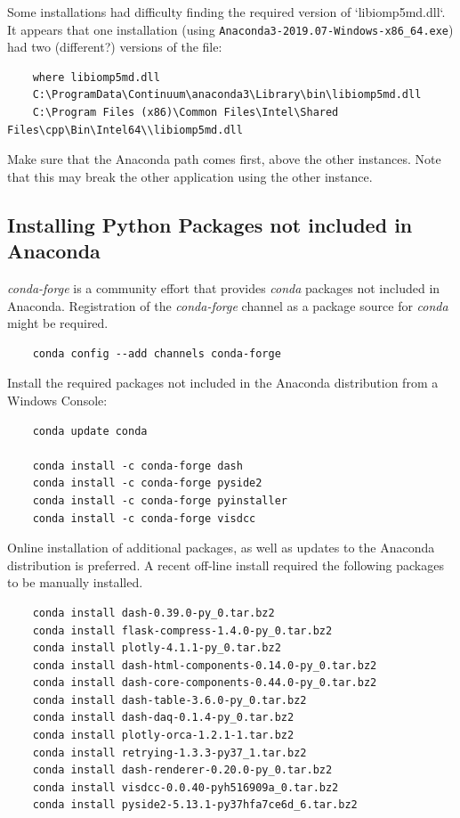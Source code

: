 Some installations had difficulty finding the required version of  `libiomp5md.dll`. It appears that one installation (using  \lstinline{Anaconda3-2019.07-Windows-x86_64.exe}) had two (different?) versions of the file:

\footnotesize
\begin{lstlisting}
    where libiomp5md.dll
    C:\ProgramData\Continuum\anaconda3\Library\bin\libiomp5md.dll
    C:\Program Files (x86)\Common Files\Intel\Shared Files\cpp\Bin\Intel64\\libiomp5md.dll
\end{lstlisting}
\normalsize
Make sure that the Anaconda path comes first, above the other instances.  Note that this may break the other application using the other instance.

\subsection{Installing Python Packages not included in Anaconda}

\textit{conda-forge} is a community effort that provides \textit{conda} packages not included in Anaconda. Registration of the \textit{conda-forge} channel as a package source for \textit{conda} might be required.

\footnotesize
\begin{lstlisting}
    conda config --add channels conda-forge
\end{lstlisting}
\normalsize

Install the required packages not included in the Anaconda distribution from a Windows Console:
\footnotesize
\begin{lstlisting}
    conda update conda

    conda install -c conda-forge dash
    conda install -c conda-forge pyside2
    conda install -c conda-forge pyinstaller
    conda install -c conda-forge visdcc

\end{lstlisting}
\normalsize

Online installation of additional packages, as well as updates to the Anaconda distribution is preferred.
A recent off-line install required the following packages to be manually installed.

\footnotesize
\begin{lstlisting}
    conda install dash-0.39.0-py_0.tar.bz2
    conda install flask-compress-1.4.0-py_0.tar.bz2
    conda install plotly-4.1.1-py_0.tar.bz2
    conda install dash-html-components-0.14.0-py_0.tar.bz2
    conda install dash-core-components-0.44.0-py_0.tar.bz2
    conda install dash-table-3.6.0-py_0.tar.bz2
    conda install dash-daq-0.1.4-py_0.tar.bz2
    conda install plotly-orca-1.2.1-1.tar.bz2
    conda install retrying-1.3.3-py37_1.tar.bz2
    conda install dash-renderer-0.20.0-py_0.tar.bz2
    conda install visdcc-0.0.40-pyh516909a_0.tar.bz2
    conda install pyside2-5.13.1-py37hfa7ce6d_6.tar.bz2

\end{lstlisting}
\normalsize


